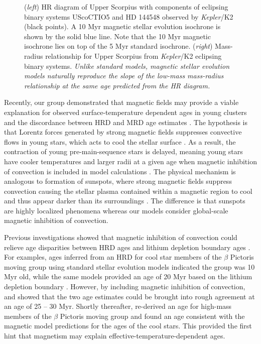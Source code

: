 \begin{figure}
    \caption{({\it left}) HR diagram of Upper Scorpius with components of eclipsing binary systems UScoCTIO5 \citep{Kraus2015} and HD 144548 \citep{Alonso2015}
    observed by {\it Kepler}/K2 (black points). A 10 Myr magnetic stellar evolution isochrone is shown by the solid blue line. Note that the 10 Myr magnetic isochrone lies on top of the 5 Myr standard isochrone. ({\it right}) Mass-radius relationship for Upper Scorpius from {\it Kepler}/K2 eclipsing binary systems. {\it Unlike standard models, magnetic stellar evolution models naturally reproduce the slope of the low-mass mass-radius relationship at the same age predicted from the HR diagram.}}
    \label{fig:usco}
    \vspace{-0.2in}
\end{figure}

Recently, our group demonstrated that magnetic fields may provide a viable explanation for observed surface-temperature dependent ages in young clusters and the discordance between HRD and MRD age estimates \citep[see Figure~\ref{fig:usco};][]{Feiden2016}. The hypothesis is that Lorentz forces generated by strong magnetic fields suppresses convective flows in young stars, which acts to cool the stellar surface \citep[e.g.,][]{DAntona2000, MM01, FC12b}. As a result, the contraction of young pre-main-sequence stars is delayed, meaning young stars have cooler temperatures and larger radii at a given age when magnetic inhibition of convection is included in model calculations \citep{MM10, Feiden2016}. The physical mechanism is analogous to formation of sunspots, where strong magnetic fields suppress convection causing the stellar plasma contained within a magnetic region to cool and thus appear darker than its surroundings \citep{Biermann1941, Deinzer1965}. The difference is that sunspots are highly localized phenomena whereas our models consider global-scale magnetic inhibition of convection. 

Previous investigations showed that magnetic inhibition of convection could relieve age disparities between HRD ages and lithium depletion boundary ages \citep{DAntona2000}. For examples, ages inferred from an HRD for cool star members of the $\beta$ Pictoris moving group using standard stellar evolution models indicated the group was 10 Myr old, while the same models provided an age of 20 Myr based on the lithium depletion boundary \citep{Someone2005, Binks2013}. However, by including magnetic inhibition of convection, \citet{MM10} and \citet{Malo2014} showed that the two age estimates could be brought into rough agreement at an age of 25 -- 30 Myr. Shortly thereafter, \citet{Mamajek2014} re-derived an age for high-mass members of the $\beta$ Pictoris moving group and found an age consistent with the magnetic model predictions for the ages of the cool stars. This provided the first hint that magnetism may explain effective-temperature-dependent ages.

